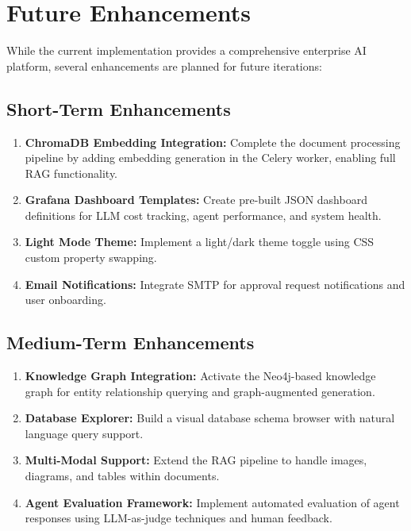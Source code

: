 \documentclass[12pt, a4paper]{report}
\begin{document}
\chapter{Future Enhancements}

While the current implementation provides a comprehensive enterprise AI platform, several enhancements are planned for future iterations:

\section{Short-Term Enhancements}

\begin{enumerate}
    \item \textbf{ChromaDB Embedding Integration:} Complete the document processing pipeline by adding embedding generation in the Celery worker, enabling full RAG functionality.
    \item \textbf{Grafana Dashboard Templates:} Create pre-built JSON dashboard definitions for LLM cost tracking, agent performance, and system health.
    \item \textbf{Light Mode Theme:} Implement a light/dark theme toggle using CSS custom property swapping.
    \item \textbf{Email Notifications:} Integrate SMTP for approval request notifications and user onboarding.
\end{enumerate}

\section{Medium-Term Enhancements}

\begin{enumerate}
    \item \textbf{Knowledge Graph Integration:} Activate the Neo4j-based knowledge graph for entity relationship querying and graph-augmented generation.
    \item \textbf{Database Explorer:} Build a visual database schema browser with natural language query support.
    \item \textbf{Multi-Modal Support:} Extend the RAG pipeline to handle images, diagrams, and tables within documents.
    \item \textbf{Agent Evaluation Framework:} Implement automated evaluation of agent responses using LLM-as-judge techniques and human feedback.
\end{enumerate}
\end{document}
